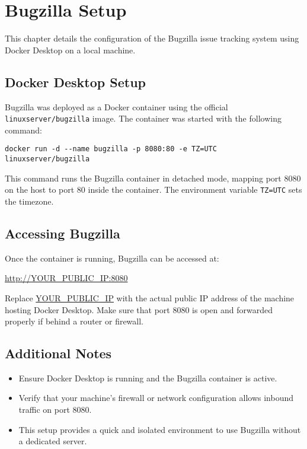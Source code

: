 \chapter{Bugzilla Setup}
\label{ch:bugzilla}

This chapter details the configuration of the Bugzilla issue tracking system using Docker Desktop on a local machine.

\section{Docker Desktop Setup}

Bugzilla was deployed as a Docker container using the official \texttt{linuxserver/bugzilla} image. The container was started with the following command:

\begin{verbatim}
docker run -d --name bugzilla -p 8080:80 -e TZ=UTC linuxserver/bugzilla
\end{verbatim}

This command runs the Bugzilla container in detached mode, mapping port 8080 on the host to port 80 inside the container. The environment variable \texttt{TZ=UTC} sets the timezone.

\section{Accessing Bugzilla}

Once the container is running, Bugzilla can be accessed at:

\begin{center}
\url{http://YOUR_PUBLIC_IP:8080}
\end{center}

Replace \url{YOUR_PUBLIC_IP} with the actual public IP address of the machine hosting Docker Desktop. Make sure that port 8080 is open and forwarded properly if behind a router or firewall.

\section{Additional Notes}

\begin{itemize}
    \item Ensure Docker Desktop is running and the Bugzilla container is active.
    \item Verify that your machine's firewall or network configuration allows inbound traffic on port 8080.
    \item This setup provides a quick and isolated environment to use Bugzilla without a dedicated server.
\end{itemize}

